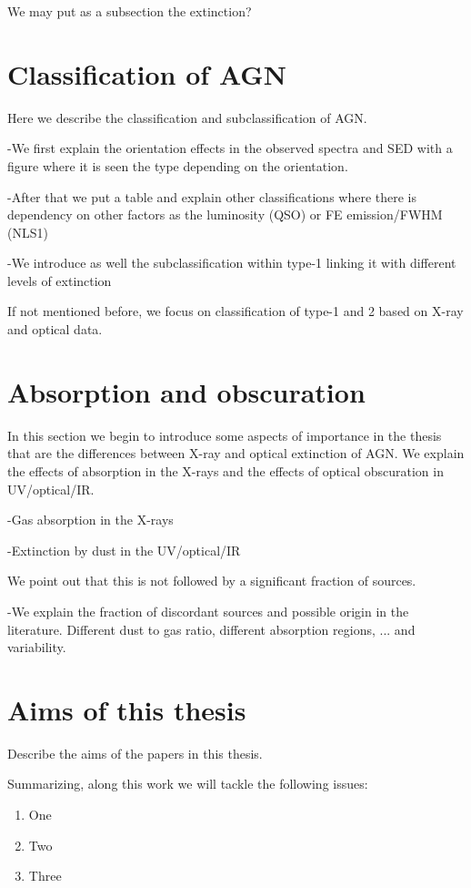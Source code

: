 We may put as a subsection the extinction?



\section{Classification of AGN}
\label{sec1:class}

Here we describe the classification and subclassification of AGN.

-We first explain the orientation effects in the observed spectra and SED with a figure where it is seen the type depending on the orientation.

-After that we put a table and explain other classifications where there is dependency on other factors as the luminosity (QSO) or FE emission/FWHM (NLS1)

-We introduce as well the subclassification within type-1 linking it with different levels of extinction

If not mentioned before, we focus on classification of type-1 and 2 based on X-ray and optical data.

\section{Absorption and obscuration}
\label{sec1:abs}

In this section we begin to introduce some aspects of importance in the thesis that are the differences between X-ray and optical extinction of AGN. We explain the effects of absorption in the X-rays and the effects of optical obscuration in UV/optical/IR.

-Gas absorption in the X-rays

-Extinction by dust in the UV/optical/IR

We point out that this is not followed by a significant fraction of sources.

-We explain the fraction of discordant sources and possible origin in the literature. Different dust to gas ratio, different absorption regions, ... and variability.


\section{Aims of this thesis}
\label{sec1:aim}

Describe the aims of the papers in this thesis.

Summarizing, along this work we will tackle the following issues:
\begin{enumerate}
\item One

\item Two

\item Three

\end{enumerate}

